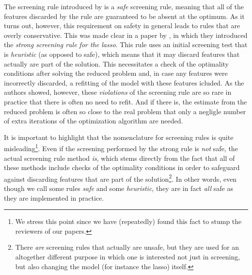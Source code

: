 The screening rule introduced by \textcite{elghaoui2010} is a \emph{safe} screening rule, meaning that all of the features discarded by the rule are guaranteed to be absent at the optimum. As it turns out, however, this requirement on safety in general leads to rules that are overly conservative. This was made clear in a paper by \textcite{tibshirani2012}, in which they introduced the \emph{strong screening rule for the lasso}. This rule uses an initial screening test that is \emph{heuristic} (as opposed to safe), which means that it may discard features that actually are part of the solution. This necessitates a check of the optimality conditions after solving the reduced problem and, in case any features were incorrectly discarded, a refitting of the model with these features icluded. As the authors showed, however, these \emph{violations} of the screening rule are so rare in practice that there is often no need to refit. And if there is, the estimate from the reduced problem is often so close to the real problem that only a negligle number of extra iterations of the optimization algorithm are needed.

It is important to highlight that the nomenclature for screening rules is quite misleading\footnote{We stress this point since we have (repeatedly) found this fact to stump the reviewers of our papers.}. Even if the screening performed by the strong rule is \emph{not} safe, the actual screening rule method \emph{is}, which stems directly from the fact that all of these methods include checks of the optimality conditions in order to safeguard against discarding features that are part of the solution\footnote{There \emph{are} screening rules that actually are unsafe, but they are used for an altogether different purpose in which one is interested not just in screening, but also changing the model (for instance the lasso) itself.}. In other words, even though we call some rules \emph{safe} and some \emph{heuristic}, they are in fact \emph{all} safe as they are implemented in practice.

